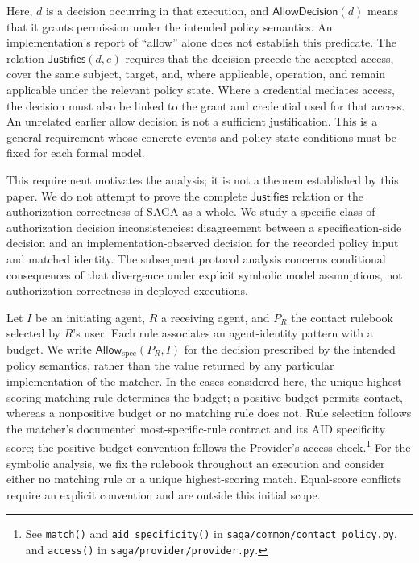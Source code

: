 Here, $d$ is a decision occurring in that execution, and
$\mathsf{AllowDecision}(d)$ means that it grants permission under the intended
policy semantics. An implementation's report of ``allow'' alone does not
establish this predicate. The relation $\mathsf{Justifies}(d,e)$ requires that
the decision precede the accepted access, cover the same subject, target, and,
where applicable, operation, and remain applicable under the relevant policy
state. Where a credential mediates access, the decision must also be linked to the grant and
credential used for that access. An unrelated earlier allow decision is not
a sufficient justification. This is a general requirement whose concrete
events and policy-state conditions must be fixed for each formal model.

This requirement motivates the analysis; it is not a theorem established by
this paper. We do not attempt to prove the complete $\mathsf{Justifies}$
relation or the authorization correctness of SAGA as a whole. We study a
specific class of authorization decision inconsistencies: disagreement
between a specification-side decision and an implementation-observed decision
for the recorded policy input and matched identity. The subsequent protocol
analysis concerns conditional consequences of that divergence under explicit
symbolic model assumptions, not authorization correctness in deployed executions.

Let $I$ be an initiating agent, $R$ a receiving agent, and $P_R$ the contact
rulebook selected by $R$'s user. Each rule associates an agent-identity pattern
with a budget. We write $\mathsf{Allow}_{\mathrm{spec}}(P_R,I)$ for the decision
prescribed by the intended policy semantics, rather than the value returned by
any particular implementation of the matcher. In the cases considered here,
the unique highest-scoring matching rule determines the budget; a positive
budget permits contact, whereas a nonpositive budget or no matching rule does
not. Rule selection follows the matcher's documented most-specific-rule
contract and its AID specificity score; the positive-budget convention follows
the Provider's access check.\footnote{\raggedright See \texttt{match()} and
\texttt{aid\_specificity()} in
\texttt{saga/\allowbreak common/\allowbreak contact\_policy.py}, and
\texttt{access()} in \texttt{saga/\allowbreak provider/\allowbreak provider.py}.}
For the symbolic analysis, we fix the rulebook throughout an execution and
consider either no matching rule or a unique highest-scoring match. Equal-score conflicts require
an explicit convention and are outside this initial scope.

